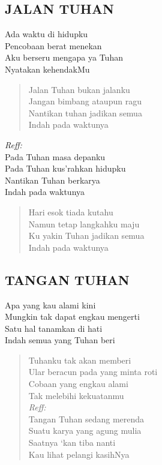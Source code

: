 \subsection{ JALAN TUHAN}
\begin{altverse}
Ada waktu di hidupku\\
Pencobaan berat menekan\\
Aku berseru mengapa ya Tuhan\\
Nyatakan kehendakMu
\end{altverse}

\begin{verse}
Jalan Tuhan bukan jalanku\\
Jangan bimbang ataupun ragu\\
Nantikan tuhan jadikan semua\\
Indah pada waktunya
\end{verse}

\begin{altverse}
\textit{Reff:}\\
Pada Tuhan masa depanku\\
Pada Tuhan kus’rahkan hidupku\\
Nantikan Tuhan berkarya\\
Indah pada waktunya
\end{altverse}

\begin{verse}
Hari esok tiada kutahu\\
Namun tetap langkahku maju\\
Ku yakin Tuhan jadikan semua\\
Indah pada waktunya
\end{verse}

\subsection{ TANGAN TUHAN}
\begin{altverse}
Apa yang kau alami kini\\
Mungkin tak dapat engkau mengerti\\
Satu hal tanamkan di hati\\
Indah semua yang Tuhan beri
\end{altverse}

\begin{verse}
Tuhanku tak akan memberi\\
Ular beracun pada yang minta roti\\
Cobaan yang engkau alami\\
Tak melebihi kekuatanmu\\
\textit{Reff:}\\
Tangan Tuhan sedang merenda\\
Suatu karya yang agung mulia\\
Saatnya ‘kan tiba nanti\\
Kau lihat pelangi kasihNya
\end{verse}

